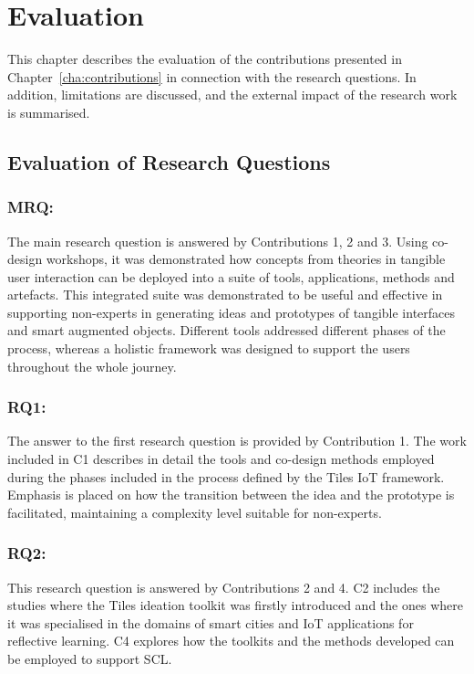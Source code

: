 \chapter{Evaluation}
\label{cha:evaluation}

This chapter describes the evaluation of the contributions presented in Chapter~\ref{cha:contributions} in connection with the research questions. In addition, limitations are discussed, and the external impact of the research work is summarised.


\section{Evaluation of Research Questions}

\subsection*{MRQ: \MRQ}
\label{mrq}
The main research question is answered by Contributions 1, 2 and 3. Using co-design workshops, it was demonstrated how concepts from theories in tangible user interaction can be deployed into a suite of tools, applications, methods and artefacts. This integrated suite was demonstrated to be useful and effective in supporting non-experts in generating ideas and prototypes of tangible interfaces and smart augmented objects. Different tools addressed different phases of the process, whereas a holistic framework was designed to support the users throughout the whole journey.

\subsection*{RQ1: \RQi}
\label{rq1}
The answer to the first research question is provided by Contribution 1. The work included in C1 describes in detail the tools and co-design methods employed during the phases included in the process defined by the Tiles IoT framework. Emphasis is placed on how the transition between the idea and the prototype is facilitated, maintaining a complexity level suitable for non-experts.

\subsection*{RQ2: \RQii}
\label{rq2}
This research question is answered by Contributions 2 and 4. C2 includes the studies where the Tiles ideation toolkit was firstly introduced and the ones where it was specialised in the domains of smart cities and IoT applications for reflective learning. C4 explores how the toolkits and the methods developed can be employed to support SCL.

